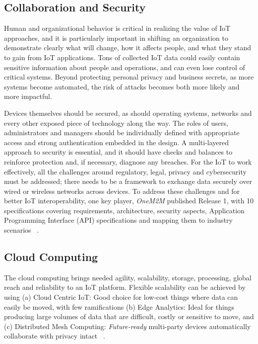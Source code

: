 \documentclass[sigconf]{acmart}
\begin{document}
		
	\subsection{Collaboration and Security}
	Human and organizational behavior is critical in realizing the value of IoT approaches, and it is particularly important in shifting an organization to demonstrate clearly what will change, how it affects people, and what they stand to gain from IoT applications. Tons of collected IoT data could easily contain sensitive information about people and operations, and can even lose control of critical systems. Beyond protecting personal privacy and business secrets, as more systems become automated, the risk of attacks becomes both more likely and more impactful. 
	
	Devices themselves should be secured, as should operating systems, networks and every other exposed piece of technology along the way. The roles of users, administrators and managers should be individually defined with appropriate access and strong authentication embedded in the design. A multi-layered approach to security is essential, and it should have checks and balances to reinforce protection and, if necessary, diagnose any breaches. For the IoT to work effectively, all the challenges around regulatory, legal, privacy and cybersecurity must be addressed; there needs to be a framework to exchange data securely over wired or wireless networks across devices. To address these challenges and for better IoT interoperability, one key player, {\em OneM2M} published Release 1, with 10 specifications covering requirements, architecture, security aspects, Application Programming Interface (API) specifications and mapping them to industry scenarios ~\cite{one-m2m}.
	
	\subsection{Cloud Computing}
	The cloud computing brings needed agility, scalability, storage, processing, global reach and reliability to an IoT platform. Flexible scalability can be achieved by using (a) Cloud Centric IoT: Good choice for low-cost things where data can easily be moved, with few ramifications (b) Edge Analytics: Ideal for things producing large volumes of data that are difficult, costly or sensitive to move, and (c) Distributed Mesh Computing: {\em Future-ready} multi-party devices automatically collaborate with privacy intact ~\cite{hp}. 
	
\end{document}
